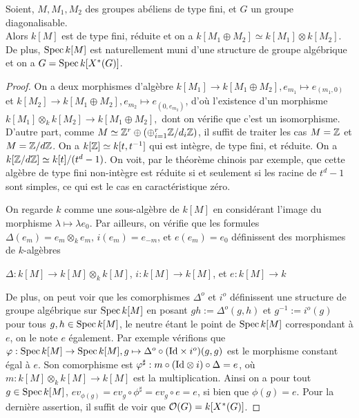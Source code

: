 \begin{prop}
Soient, $M, M_1, M_2$ des groupes abéliens de type fini, et $G$ un groupe diagonalisable.\\
Alors $k[M]$ est de type fini, réduite et on a $k[M_1\oplus M_2]\simeq k[M_1]\otimes k[M_2]$. De plus, $\operatorname{Spec} k[M]$ est naturellement muni d'une structure de groupe algébrique et on a $G=\operatorname{Spec} k[X^*(G)]$.
\end{prop}
\begin{proof}
On a deux morphismes d'algèbre $k[M_1]\rightarrow k[M_1\oplus M_2], e_{m_1}\mapsto e_{(m_1,0)}$ et $k[M_2]\rightarrow k[M_1\oplus M_2], e_{m_2}\mapsto e_{(0,e_{m_2})}$, d'où l'existence d'un morphisme $k[M_1]\otimes_k k[M_2]\rightarrow k[M_1\oplus M_2], $ dont on vérifie que c'est un isomorphisme.
D'autre part, comme $M\simeq \mathbb{Z}^r\oplus (\oplus_{i=1}^r \mathbb{Z}/d_i\mathbb{Z})$, il suffit de traiter les cas $M=\mathbb{Z}$ et $M=\mathbb{Z}/d\mathbb{Z}$. On a $k[\mathbb{Z}]\simeq k[t,t^{-1}]$ qui est intègre, de type fini, et réduite. On a $k[\mathbb{Z}/d\mathbb{Z}]\simeq k[t]/(t^d-1)$. On voit, par le théorème chinois par exemple, que cette algèbre de type fini non-intègre est réduite si et seulement si les racine de $t^d-1$ sont simples, ce qui est le cas en caractéristique zéro. 

On regarde $k$ comme une sous-algèbre de $k[M]$ en considérant l'image du morphisme $\lambda\mapsto \lambda e_0$. Par ailleurs, on vérifie que les formules $\Delta(e_m)=e_m\otimes_k e_m,\, i(e_m)=e_{-m}$, et $e(e_m)=e_0$ définissent des morphismes de $k$-algèbres 
\begin{center}
$\Delta:k[M]\rightarrow k[M]\otimes_k k[M]$, $i:k[M]\rightarrow k[M]$, et $e:k[M]\rightarrow k$
\end{center}
De plus, on peut voir que les comorphismes $\Delta^o$ et $i^o$ définissent une structure de groupe algébrique sur $\operatorname{Spec} k[M]$ en posant $gh:=\Delta^o(g,h)$ et $g^{-1}:=i^o(g)$ pour tous $g, h\in \operatorname{Spec} k[M]$, le neutre étant le point de $\operatorname{Spec} k[M]$ correspondant à $e$, on le note $e$ également. Par exemple vérifions que $\varphi:\operatorname{Spec} k[M]\rightarrow \operatorname{Spec} k[M], g\mapsto \Delta^o\circ(\mathrm{Id}\times i^o)(g,g)$ est le morphisme constant égal à $e$. Son comorphisme est $\varphi^\sharp:m\circ (\mathrm{Id}\otimes i)\circ\Delta=e$, où $m:k[M]\otimes_k k[M]\rightarrow k[M]$ est la multiplication. Ainsi on a pour tout $g\in \operatorname{Spec} k[M]$, $ev_{\phi(g)}=ev_g\circ \phi^\sharp=ev_g\circ e=e$, si bien que $\phi(g)=e$. Pour la dernière assertion, il suffit de voir que $\mathcal{O}(G)=k[X^*(G)]$.

\end{proof}

